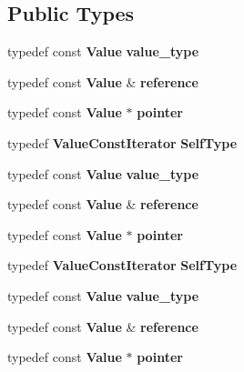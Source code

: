\subsection*{Public Types}
\begin{DoxyCompactItemize}
\item 
typedef const {\bf Value} {\bfseries value\+\_\+type}\label{class_json_1_1_value_const_iterator_aa5f1707dcef4bfe73e23ddc14dbe760d}

\item 
typedef const {\bf Value} \& {\bfseries reference}\label{class_json_1_1_value_const_iterator_aa9b05c6a37cd352ea1ee6e13b816f709}

\item 
typedef const {\bf Value} $\ast$ {\bfseries pointer}\label{class_json_1_1_value_const_iterator_a400136bd8bc09e9fddec0785fa2cff14}

\item 
typedef {\bf Value\+Const\+Iterator} {\bfseries Self\+Type}\label{class_json_1_1_value_const_iterator_a0c2e33e7eb5a80dd8709fb28ece83933}

\item 
typedef const {\bf Value} {\bfseries value\+\_\+type}\label{class_json_1_1_value_const_iterator_aa5f1707dcef4bfe73e23ddc14dbe760d}

\item 
typedef const {\bf Value} \& {\bfseries reference}\label{class_json_1_1_value_const_iterator_aa9b05c6a37cd352ea1ee6e13b816f709}

\item 
typedef const {\bf Value} $\ast$ {\bfseries pointer}\label{class_json_1_1_value_const_iterator_a400136bd8bc09e9fddec0785fa2cff14}

\item 
typedef {\bf Value\+Const\+Iterator} {\bfseries Self\+Type}\label{class_json_1_1_value_const_iterator_a0c2e33e7eb5a80dd8709fb28ece83933}

\item 
typedef const {\bf Value} {\bfseries value\+\_\+type}\label{class_json_1_1_value_const_iterator_aa5f1707dcef4bfe73e23ddc14dbe760d}

\item 
typedef const {\bf Value} \& {\bfseries reference}\label{class_json_1_1_value_const_iterator_aa9b05c6a37cd352ea1ee6e13b816f709}

\item 
typedef const {\bf Value} $\ast$ {\bfseries pointer}\label{class_json_1_1_value_const_iterator_a400136bd8bc09e9fddec0785fa2cff14}


\end{DoxyCompactItemize}
